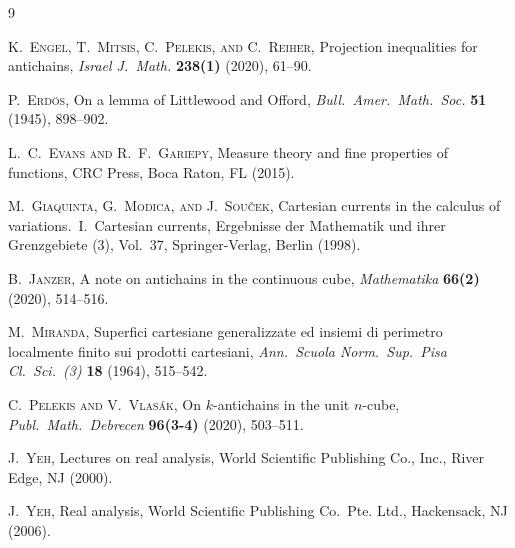 \documentclass[10pt,a4paper]{amsart}
\begin{document}
\begin{thebibliography}{9}

 \textsc{K.\ Engel, T.\ Mitsis, C.\ Pelekis, and C.\ Reiher}, 
 Projection inequalities for antichains, 
 \emph{Israel J.\ Math.} {\bf 238(1)} (2020), 61--90. 

 \textsc{P.\ Erd\"os}, 
 On a lemma of {L}ittlewood and {O}fford, 
 \emph{Bull.\ Amer.\ Math.\ Soc.} {\bf 51} (1945), 898--902. 

 \textsc{L.\ C.\ Evans and R.\ F.\ Gariepy}, 
 Measure theory and fine properties of functions, 
 CRC Press, Boca Raton, FL (2015). 

 \textsc{M.\ Giaquinta, G.\ Modica, and J.\ Sou\v{c}ek},
 Cartesian currents in the calculus of variations.\ I.\ Cartesian currents,
 Ergebnisse der Mathematik und ihrer Grenzgebiete (3), Vol.~37,
 Springer-Verlag, Berlin (1998).

 \textsc{B.\ Janzer}, 
 A note on antichains in the continuous cube, 
 \emph{Mathematika} {\bf 66(2)} (2020), 514--516. 

 \textsc{M.\ Miranda}, 
 Superfici cartesiane generalizzate ed insiemi di perimetro localmente finito sui prodotti cartesiani, 
 \emph{Ann.\ Scuola Norm.\ Sup.\ Pisa Cl.\ Sci.\ (3)} {\bf 18} (1964), 515--542. 

 \textsc{C.\ Pelekis and V.\ Vlas\'ak}, 
 On {$k$}-antichains in the unit {$n$}-cube, 
 \emph{Publ.\ Math.\ Debrecen} {\bf 96(3-4)} (2020), 503--511. 

 \textsc{J.\ Yeh}, 
 Lectures on real analysis, 
 World Scientific Publishing Co., Inc., River Edge, NJ (2000). 

 \textsc{J.\ Yeh}, 
 Real analysis, 
 World Scientific Publishing Co.\ Pte. Ltd., Hackensack, NJ (2006). 

\end{thebibliography}
\end{document}
